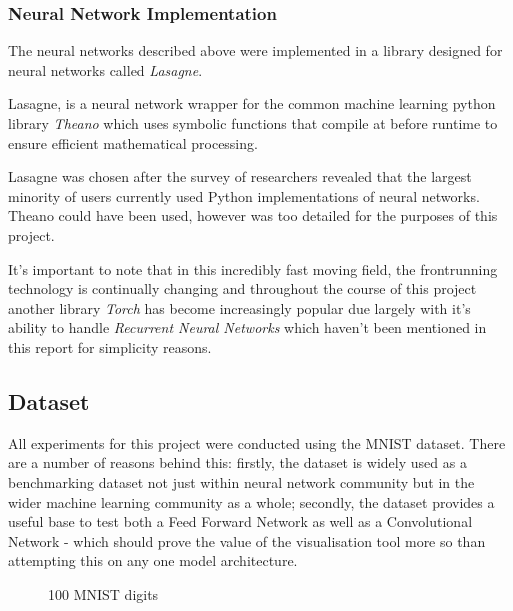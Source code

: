 \documentclass[a4paper,11pt,titlepage]{article}
\begin{document}
		\subsubsection{Neural Network Implementation}
		The neural networks described above were implemented in a library designed for neural networks called \textit{Lasagne}.
		\par 
		Lasagne, is a neural network wrapper for the common machine learning python library \textit{Theano} which uses symbolic functions that compile at before runtime to ensure efficient mathematical processing. 
		\par 
		Lasagne was chosen after the survey of researchers revealed that the largest minority of users currently used Python implementations of neural networks. Theano could have been used, however was too detailed for the purposes of this project. 
		\par 
		It's important to note that in this incredibly fast moving field, the frontrunning technology is continually changing and throughout the course of this project another library \textit{Torch} has become increasingly popular due largely with it's ability to handle \textit{Recurrent Neural Networks} which haven't been mentioned in this report for simplicity reasons. 
	
	\subsection{Dataset}

	All experiments for this project were conducted using the MNIST dataset. There are a number of reasons behind this: firstly, the dataset is widely used as a  benchmarking dataset not just within neural network community but in the wider machine learning community as a whole; secondly, the dataset provides a useful base to test both a Feed Forward Network as well as a Convolutional Network - which should prove the value of the visualisation tool more so than attempting this on any one model architecture.
	
	\begin{figure}[H]
    			\caption{100 MNIST digits}%
	\end{figure}
	
\end{document}
